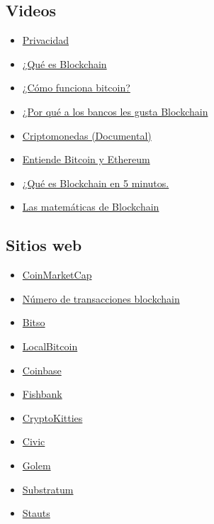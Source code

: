 \documentclass[a4paper,12pt]{/home/armando/Documentos/Cursos/LaTeX/Plantillas/lib/pub}
\begin{document}
\subsection{Videos}
\begin{itemize}
	\item \href{https://www.youtube.com/watch?v=RSj9QQMPMWg}{Privacidad}
	\item \href{https://www.youtube.com/watch?v=E2QT9RHmNsY}{¿Qué es Blockchain}	
	\item \href{https://www.youtube.com/watch?v=t5JGQXCTe3c}{¿Cómo funciona bitcoin?}
	\item \href{https://www.youtube.com/watch?v=DAjtCmA-vxE\&feature=youtu.be}{¿Por qué a los bancos les gusta Blockchain}
	\item \href{https://www.youtube.com/watch?v=S00MWI3YeP4\&pbjreload=10}{Criptomonedas (Documental)}
	\item \href{https://www.youtube.com/watch?v=YBNr69vrscw\&list=PLgo3Qtdm2bOMKyzFGy-B3MiDAGPIeqbKP}{Entiende Bitcoin y Ethereum}
	\item \href{https://www.youtube.com/watch?v=Yn8WGaO\_\_ak\&list=PLgo3Qtdm2bOMKyzFGy-B3MiDAGPIeqbKP\&index=2}{¿Qué es Blockchain en 5 minutos.}
	\item \href{https://www.youtube.com/watch?v=b5dhq3dSG2k}{Las matemáticas de Blockchain}
\end{itemize}

\subsection{Sitios web}
\begin{itemize}
	\item \href{https://coinmarketcap.com/}{CoinMarketCap}
	\item \href{https://www.blockchain.com/charts/n-transactions?timespan=all}{Número de transacciones blockchain}
	\item \href{https://bitso.com/}{Bitso}
	\item \href{https://localbitcoins.com/}{LocalBitcoin}
	\item \href{https://www.coinbase.com/}{Coinbase}
	\item \href{https://fishbank.io/n/?r=1}{Fishbank}
	\item \href{https://www.cryptokitties.co/}{CryptoKitties}
	\item \href{https://www.civic.com/}{Civic}
	\item \href{https://golem.network/}{Golem}
	\item \href{https://substratum.net/}{Substratum}
	\item \href{https://status.im/}{Stauts}
\end{itemize}
\end{document}
